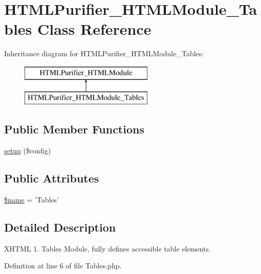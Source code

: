 \hypertarget{classHTMLPurifier__HTMLModule__Tables}{\section{H\+T\+M\+L\+Purifier\+\_\+\+H\+T\+M\+L\+Module\+\_\+\+Tables Class Reference}
\label{classHTMLPurifier__HTMLModule__Tables}
}
Inheritance diagram for H\+T\+M\+L\+Purifier\+\_\+\+H\+T\+M\+L\+Module\+\_\+\+Tables\+:\begin{figure}[H]
\begin{center}
\leavevmode
\includegraphics[height=2.000000cm]{classHTMLPurifier__HTMLModule__Tables}
\end{center}
\end{figure}
\subsection*{Public Member Functions}
\begin{DoxyCompactItemize}
\item 
\hyperlink{classHTMLPurifier__HTMLModule__Tables_a699f03fdc185670784a4cac9fd701235}{setup} (\$config)
\end{DoxyCompactItemize}
\subsection*{Public Attributes}
\begin{DoxyCompactItemize}
\item 
\hyperlink{classHTMLPurifier__HTMLModule__Tables_a6b21e3468f4511d1ebd064b6e426fc8c}{\$name} = 'Tables'
\end{DoxyCompactItemize}


\subsection{Detailed Description}
X\+H\+T\+M\+L 1. Tables Module, fully defines accessible table elements. 

Definition at line 6 of file Tables.\+php.



